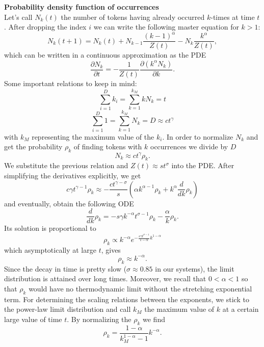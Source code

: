 \documentclass[draft,final]{vutinfth} %
\begin{document}
\vspace{1mm}\noindent\textbf{Probability density function of occurrences}\\
Let's call $N_{k}(t)$ the number of tokens having already occurred $k$-times at time $t$.
After dropping the index $i$ we can write the following master equation for $k>1$:
\begin{equation}
    N_k(t+1) = N_k(t) + N_{k-1} \frac{(k-1)^\alpha}{Z(t)} - N_k \frac{k^\alpha}{Z(t)},
\end{equation}
which can be written in a continuous approximation as the PDE
\begin{equation}
    \frac{\partial N_k}{\partial t} = 
        -\frac{1}{Z(t)}\frac{\partial (k^\alpha N_k)}{\partial k}.
\end{equation}
Some important relations to keep in mind:
\begin{equation}
    \sum_{i=1}^{D} k_i = \sum_{k=1}^{k_M} k N_k = t
\end{equation}
\begin{equation}
    \sum_{i=1}^{D} 1 = \sum_{k=1}^{k_M} N_k = D\approx c t^\gamma
\end{equation}
with $k_M$ representing the maximum value of the $k_i$.
In order to normalize $N_k$ and get the probability $\rho_k$ of finding tokens with $k$ occurrences we  divide by $D$
\begin{equation}
    N_k \approx c t^\gamma \rho_k.
\end{equation}
We substitute the previous relation and $Z(t)\approx s t^\sigma$ into the PDE.
After simplifying the derivatives explicitly, we get
\begin{equation}
    c\gamma t^{\gamma-1} \rho_k \approx - \frac{c t^{\gamma-\sigma}}{s} \left(
        \alpha k^{\alpha-1}\rho_k+k^\alpha \frac{d}{dk}\rho_k
    \right)
\end{equation}
and eventually, obtain the following ODE
\begin{equation}
    \frac{d}{dk}\rho_k = 
        -s\gamma k^{-\alpha}t^{\sigma-1}\rho_k - \frac{\alpha}{k} \rho_k.
\end{equation}
Its solution is proportional to
\begin{equation}
    \rho_k \propto k^{-\alpha} e^{-\frac{s\gamma t^{\sigma-1} }{1-\alpha}k^{1-\alpha}} 
\end{equation}
which asymptotically at large $t$, gives
\begin{equation}
    \rho_k\approx k^{-\alpha}. 
\end{equation}
Since the decay in time is pretty slow ($\sigma\approx 0.85$ in our systems), the limit distribution is attained over long times.
Moreover, we recall that $0<\alpha<1$ so that $\rho_k$ would have no thermodynamic limit without the stretching exponential term.
For determining the scaling relations between the exponents, we stick to the power-law limit distribution and call $k_M$ the maximum value of $k$ at a certain large value of time $t$.
By normalizing the $\rho_k$ we find
\begin{equation}
    \rho_k= \frac{1-\alpha}{k_M^{1-\alpha}-1} k^{-\alpha}.
\end{equation}
\end{document}
